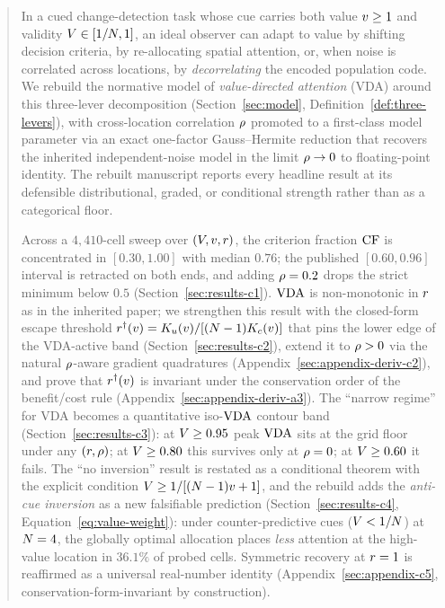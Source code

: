 \begin{abstract}
\noindent
In a cued change-detection task whose cue carries both value
$\val \ge 1$ and validity $\valid \in [1/\Nloc, 1]$, an ideal observer
can adapt to value by shifting decision criteria, by re-allocating
spatial attention, or, when noise is correlated across locations, by
\emph{decorrelating} the encoded population code.  We rebuild the
normative model of \emph{value-directed attention} (VDA) around this
three-lever decomposition (Section~\ref{sec:model},
Definition~\ref{def:three-levers}), with cross-location correlation
$\corr$ promoted to a first-class model parameter via an exact
one-factor Gauss--Hermite reduction that recovers the inherited
independent-noise model in the limit $\corr \to 0$ to floating-point
identity.  The rebuilt manuscript reports every headline result at
its defensible distributional, graded, or conditional strength
rather than as a categorical floor.

Across a $4{,}410$-cell sweep over $(\valid, \val, \Rsens)$, the
criterion fraction $\CF$ is concentrated in $[0.30, 1.00]$ with
median $0.76$; the published $[0.60, 0.96]$ interval is retracted on
both ends, and adding $\corr = 0.2$ drops the strict minimum below
$0.5$ (Section~\ref{sec:results-c1}).  $\VDA$ is non-monotonic in
$\Rsens$ as in the inherited paper; we strengthen this result with
the closed-form escape threshold
$\rdagger(\val) = K_u(\val) / [(\Nloc - 1) K_c(\val)]$ that pins the
lower edge of the VDA-active band (Section~\ref{sec:results-c2}),
extend it to $\corr > 0$ via the natural $\corr$-aware gradient
quadratures (Appendix~\ref{sec:appendix-deriv-c2}), and prove that
$\rdagger(\val)$ is invariant under the conservation order of the
benefit/cost rule (Appendix~\ref{sec:appendix-deriv-a3}).  The
``narrow regime'' for VDA becomes a quantitative iso-$\VDA$ contour
band (Section~\ref{sec:results-c3}): at $\valid \ge 0.95$ peak
$\VDA$ sits at the grid floor under any $(\Rsens, \corr)$; at
$\valid \ge 0.80$ this survives only at $\corr = 0$; at
$\valid \ge 0.60$ it fails.  The ``no inversion'' result is restated
as a conditional theorem with the explicit condition
$\valid \ge 1 / [(\Nloc - 1) \val + 1]$, and the rebuild adds the
\emph{anti-cue inversion} as a new falsifiable prediction
(Section~\ref{sec:results-c4}, Equation~\eqref{eq:value-weight}):
under counter-predictive cues ($\valid < 1/\Nloc$) at $\Nloc = 4$,
the globally optimal allocation places \emph{less} attention at the
high-value location in $36.1\%$ of probed cells.  Symmetric recovery
at $\Rsens = 1$ is reaffirmed as a universal real-number identity
(Appendix~\ref{sec:appendix-c5}, conservation-form-invariant by
construction).


\end{abstract}
